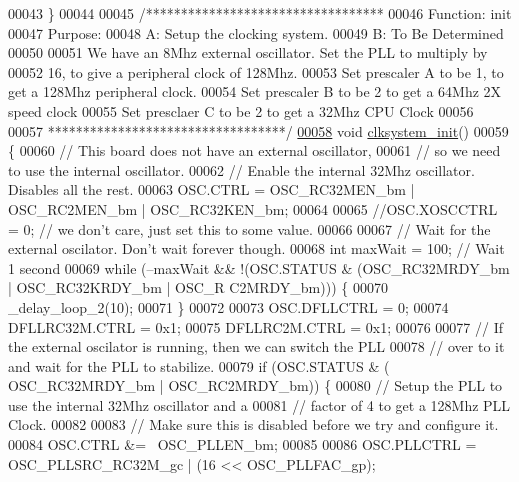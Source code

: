 \begin{DoxyCode}
{{{{00043 \}
00044 
00045 \textcolor{comment}{/**********************************}
00046 \textcolor{comment}{Function: init}
00047 \textcolor{comment}{Purpose:}
00048 \textcolor{comment}{A: Setup the clocking system.}
00049 \textcolor{comment}{B: To Be Determined}
00050 \textcolor{comment}{}
00051 \textcolor{comment}{We have an 8Mhz external oscillator. Set the PLL to multiply by}
00052 \textcolor{comment}{16, to give a peripheral clock of 128Mhz.}
00053 \textcolor{comment}{Set prescaler A to be 1, to get a 128Mhz peripheral clock.}
00054 \textcolor{comment}{Set prescaler B to be 2 to get a 64Mhz 2X speed clock}
00055 \textcolor{comment}{Set presclaer C to be 2 to get a 32Mhz CPU Clock}
00056 \textcolor{comment}{}
00057 \textcolor{comment}{**********************************/}
\hypertarget{clksystem_8cpp_source_l00058}{}\hyperlink{clksystem_8h_a8e83774f95a168320aacc0f85718b483}{00058} \textcolor{keywordtype}{void} \hyperlink{clksystem_8cpp_a098d30ebaad7a94505407605314930e5}{clksystem_init}()
00059 \{
00060     \textcolor{comment}{// This board does not have an external oscillator,}
00061     \textcolor{comment}{// so we need to use the internal oscillator.}
00062     \textcolor{comment}{// Enable the internal 32Mhz oscillator. Disables all the rest.}
00063     OSC.CTRL = OSC\_RC32MEN\_bm | OSC\_RC2MEN\_bm | OSC\_RC32KEN\_bm;
00064 
00065     \textcolor{comment}{//OSC.XOSCCTRL = 0; // we don't care, just set this to some value.}
00066 
00067     \textcolor{comment}{// Wait for the external oscilator. Don't wait forever though.}
00068     \textcolor{keywordtype}{int} maxWait = 100; \textcolor{comment}{// Wait 1 second}
00069     \textcolor{keywordflow}{while} (--maxWait && !(OSC.STATUS & (OSC\_RC32MRDY\_bm | OSC\_RC32KRDY\_bm | OSC\_R
      C2MRDY\_bm))) \{
00070         \_delay\_loop\_2(10);
00071     \}
00072 
00073     OSC.DFLLCTRL = 0;
00074     DFLLRC32M.CTRL = 0x1;
00075     DFLLRC2M.CTRL = 0x1;
00076 
00077     \textcolor{comment}{// If the external oscilator is running, then we can switch the PLL}
00078     \textcolor{comment}{// over to it and wait for the PLL to stabilize.}
00079     \textcolor{keywordflow}{if} (OSC.STATUS & ( OSC\_RC32MRDY\_bm | OSC\_RC2MRDY\_bm)) \{
00080         \textcolor{comment}{// Setup the PLL to use the internal 32Mhz oscillator and a}
00081         \textcolor{comment}{// factor of 4 to get a 128Mhz PLL Clock.}
00082 
00083         \textcolor{comment}{// Make sure this is disabled before we try and configure it.}
00084         OSC.CTRL &= ~OSC\_PLLEN\_bm;
00085 
00086         OSC.PLLCTRL = OSC\_PLLSRC\_RC32M\_gc | (16 << OSC\_PLLFAC\_gp);
}}}}
\end{DoxyCode}
